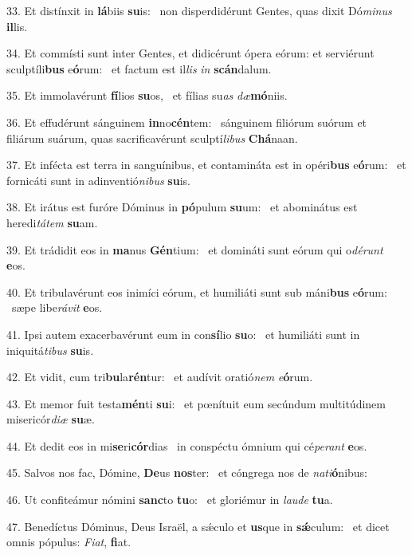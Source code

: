33. Et distínxit in \textbf{lá}biis \textbf{su}is: \ast\  non disperdidérunt Gentes, quas dixit Dó\textit{mi}\textit{nus} \textbf{il}lis.\

34. Et commísti sunt inter Gentes, et didicérunt ópera eórum: et serviérunt sculptíli\textbf{bus} e\textbf{ó}rum: \ast\  et factum est il\textit{lis} \textit{in} \textbf{scán}dalum.\

35. Et immolavérunt \textbf{fí}lios \textbf{su}os, \ast\  et fílias su\textit{as} \textit{dæ}\textbf{mó}niis.\

36. Et effudérunt sánguinem \textbf{in}no\textbf{cén}tem: \ast\  sánguinem filiórum suórum et filiárum suárum, quas sacrificavérunt sculptí\textit{li}\textit{bus} \textbf{Chá}naan.\

37. Et infécta est terra in sanguínibus, et contamináta est in opéri\textbf{bus} e\textbf{ó}rum: \ast\  et fornicáti sunt in adinventió\textit{ni}\textit{bus} \textbf{su}is.\

38. Et irátus est furóre Dóminus in \textbf{pó}pulum \textbf{su}um: \ast\  et abominátus est heredi\textit{tá}\textit{tem} \textbf{su}am.\

39. Et trádidit eos in \textbf{ma}nus \textbf{Gén}tium: \ast\  et domináti sunt eórum qui o\textit{dé}\textit{runt} \textbf{e}os.\

40. Et tribulavérunt eos inimíci eórum, et humiliáti sunt sub máni\textbf{bus} e\textbf{ó}rum: \ast\  sæpe libe\textit{rá}\textit{vit} \textbf{e}os.\

41. Ipsi autem exacerbavérunt eum in con\textbf{sí}lio \textbf{su}o: \ast\  et humiliáti sunt in iniquitá\textit{ti}\textit{bus} \textbf{su}is.\

42. Et vidit, cum tri\textbf{bu}la\textbf{rén}tur: \ast\  et audívit oratió\textit{nem} \textit{e}\textbf{ó}rum.\

43. Et memor fuit testa\textbf{mén}ti \textbf{su}i: \ast\  et pœnítuit eum secúndum multitúdinem misericór\textit{di}\textit{æ} \textbf{su}æ.\

44. Et dedit eos in mi\textbf{se}ri\textbf{cór}dias \ast\  in conspéctu ómnium qui cé\textit{pe}\textit{rant} \textbf{e}os.\

45. Salvos nos fac, Dómine, \textbf{De}us \textbf{nos}ter: \ast\  et cóngrega nos de \textit{na}\textit{ti}\textbf{ó}nibus:\

46. Ut confiteámur nómini \textbf{sanc}to \textbf{tu}o: \ast\  et gloriémur in \textit{lau}\textit{de} \textbf{tu}a.\

47. Benedíctus Dóminus, Deus Israël, a sǽculo et \textbf{us}que in \textbf{sǽ}culum: \ast\  et dicet omnis pópulus: \textit{Fi}\textit{at}, \textbf{fi}at.\

